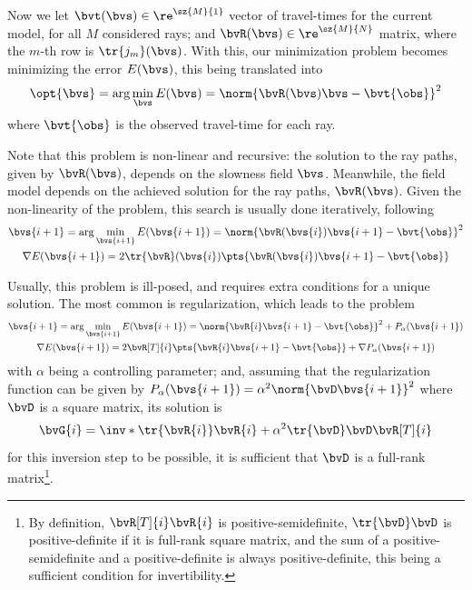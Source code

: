 Now we let $\bvt(\bvs) \in \re^{\sz{M}{1}}$ vector of travel-times for the current model, for all $M$ considered rays; and $\bvR(\bvs) \in \re^{\sz{M}{N}}$ matrix, where the $m$-th row is $\tr{j_m}(\bvs)$. With this, our minimization problem becomes minimizing the error $E(\bvs)$, this being translated into
\begin{equation}
	\opt{\bvs} = \arg\min_{\bvs} E(\bvs) = \norm{\bvR(\bvs) \bvs - \bvt{\obs}}^2
	\label{eq:sec2:def_minimization_bvz}
\end{equation}
where $\bvt{\obs}$ is the observed travel-time for each ray.

Note that this problem is non-linear and recursive: the solution to the ray paths, given by $\bvR(\bvs)$, depends on the slowness field $\bvs$. Meanwhile, the field model depends on the achieved solution for the ray paths, $\bvR(\bvs)$. Given the non-linearity of the problem, this search is usually done iteratively, following
\begin{subequations}
	\begin{gather}
		\bvs{i+1} = \arg\min_{\bvs{i+1}} E(\bvs{i+1}) = \norm{\bvR(\bvs{i}) \bvs{i+1} - \bvt{\obs}}^2 
		\label{subeq:sec2:iterative_minimization:eq1}\\
		\nabla E(\bvs{i+1}) = 2\tr{\bvR}(\bvs{i}) \pts{\bvR(\bvs{i}) \bvs{i+1} - \bvt{\obs}}
		\label{subeq:sec2:iterative_minimization:eq2}
	\end{gather}
	\label{eqs:sec2:iterative_minimization}
\end{subequations}

Usually, this problem is ill-posed, and requires extra conditions for a unique solution. The most common is regularization, which leads to the problem
\begin{subequations}
	\begin{gather}
		\bvs{i+1} = \arg\min_{\bvs{i+1}} E(\bvs{i+1}) = \norm{\bvR{i} \bvs{i+1} - \bvt{\obs}}^2 + P_\alpha(\bvs{i+1})\\
		\nabla E(\bvs{i+1}) = 2\bvR[T]{i} \pts{\bvR{i} \bvs{i+1} - \bvt{\obs}} + \nabla P_{\alpha}(\bvs{i+1})
	\end{gather}
	\label{eqs:sec2:iterative_minimization_Ezi}
\end{subequations}
with $\alpha$ being a controlling parameter; and, assuming that the regularization function can be given by $P_{\alpha}(\bvs{i+1}) = \alpha^2\norm{\bvD\bvs{i+1}}^2$ where $\bvD$ is a square matrix, its solution is
\begin{equation}
	\bvG{i} = \inv*{\tr{\bvR{i}} \bvR{i} + \alpha^2 \tr{\bvD}\bvD} \bvR[T]{i}
	\label{eq:sec2:solution_regularization-problem_simple}
\end{equation}
for this inversion step to be possible, it is sufficient that $\bvD$ is a full-rank matrix\footnote{\label{footnote:positive-definite_inversion}By definition, $\bvR[T]{i} \bvR{i}$ is positive-semidefinite, $\tr{\bvD}\bvD$ is positive-definite if it is full-rank square matrix, and the sum of a positive-semidefinite and a positive-definite is always positive-definite, this being a sufficient condition for invertibility.}.

